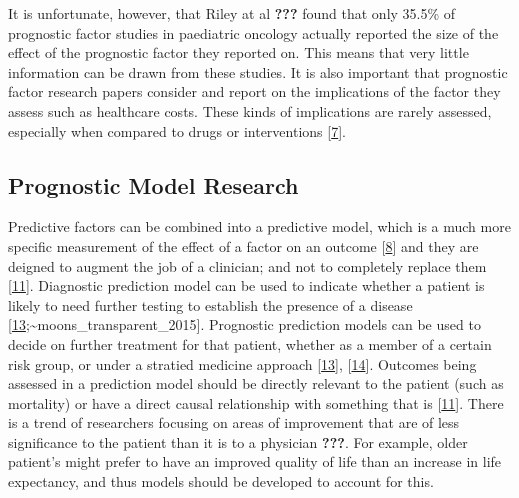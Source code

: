 \documentclass[12pt,PhD,twoside,openright]{muthesis}
\begin{document}
It is unfortunate, however, that Riley at al {\textbf{???}} found that only 35.5\% of prognostic factor studies in paediatric oncology actually reported the size of the effect of the prognostic factor they reported on. This means that very little information can be drawn from these studies. It is also important that prognostic factor research papers consider and report on the implications of the factor they assess such as healthcare costs. These kinds of implications are rarely assessed, especially when compared to drugs or interventions {[}\protect\hyperlink{ref-riley_prognosis_2013}{7}{]}.

\hypertarget{prognostic-model-research}{%
\subsection{Prognostic Model Research}\label{prognostic-model-research}}

Predictive factors can be combined into a predictive model, which is a much more specific measurement of the effect of a factor on an outcome {[}\protect\hyperlink{ref-steyerberg_prognosis_2013}{8}{]} and they are deigned to augment the job of a clinician; and not to completely replace them {[}\protect\hyperlink{ref-moons_prognosis_2009}{11}{]}. Diagnostic prediction model can be used to indicate whether a patient is likely to need further testing to establish the presence of a disease {[}\protect\hyperlink{ref-collins_transparent_2015}{13};\textasciitilde moons\_transparent\_2015{]}. Prognostic prediction models can be used to decide on further treatment for that patient, whether as a member of a certain risk group, or under a stratied medicine approach {[}\protect\hyperlink{ref-collins_transparent_2015}{13}{]}, {[}\protect\hyperlink{ref-moons_transparent_2015}{14}{]}. Outcomes being assessed in a prediction model should be directly relevant to the patient (such as mortality) or have a direct causal relationship with something that is {[}\protect\hyperlink{ref-moons_prognosis_2009}{11}{]}. There is a trend of researchers focusing on areas of improvement that are of less significance to the patient than it is to a physician {\textbf{???}}. For example, older patient's might prefer to have an improved quality of life than an increase in life expectancy, and thus models should be developed to account for this.
\end{document}
